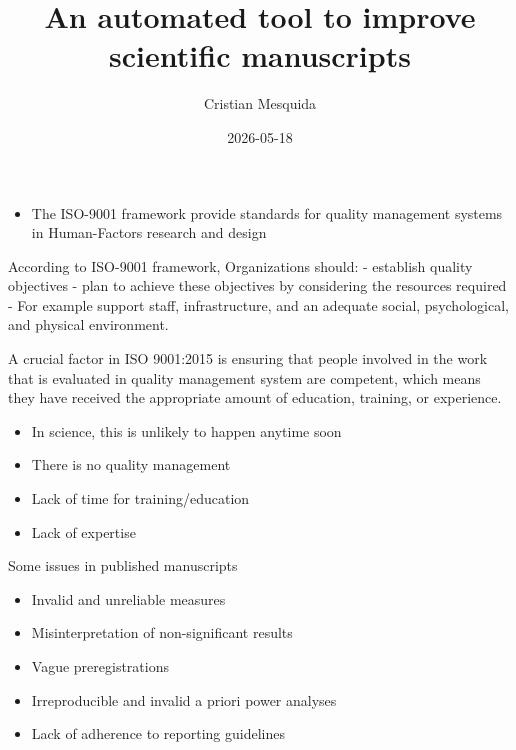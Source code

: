 \documentclass[
  ignorenonframetext,
]{beamer}
\title{\texorpdfstring{An automated tool to improve scientific
manuscripts}{An automated tool to improve scientific manuscripts}}
\author{\texorpdfstring{Cristian Mesquida}{Cristian Mesquida}}
\date{2026-05-18}
\providecommand{\tightlist}{%
  \setlength{\itemsep}{0pt}\setlength{\parskip}{0pt}}
\begin{document}
\frame{\titlepage}

\begin{frame}{}
\protect{}\label{section}
\begin{itemize}
\tightlist
\item
  The ISO-9001 framework provide standards for quality management
  systems in Human-Factors research and design
\end{itemize}
\end{frame}

\begin{frame}{}
\protect{}\label{section-1}
According to ISO-9001 framework, Organizations should: - establish
quality objectives - plan to achieve these objectives by considering the
resources required - For example support staff, infrastructure, and an
adequate social, psychological, and physical environment.
\end{frame}

\begin{frame}{}
\protect{}\label{section-2}
A crucial factor in ISO 9001:2015 is ensuring that people involved in
the work that is evaluated in quality management system are competent,
which means they have received the appropriate amount of education,
training, or experience.
\end{frame}

\begin{frame}{}
\protect{}\label{section-3}
\begin{itemize}
\tightlist
\item
  In science, this is unlikely to happen anytime soon
\item
  There is no quality management
\item
  Lack of time for training/education
\item
  Lack of expertise
\end{itemize}
\end{frame}

\begin{frame}{Some issues in published manuscripts}
\protect{}\label{some-issues-in-published-manuscripts}
\begin{itemize}
\tightlist
\item
  Invalid and unreliable measures
\item
  Misinterpretation of non-significant results
\item
  Vague preregistrations
\item
  Irreproducible and invalid a priori power analyses
\item
  Lack of adherence to reporting guidelines
\end{itemize}
\end{frame}
\end{document}
